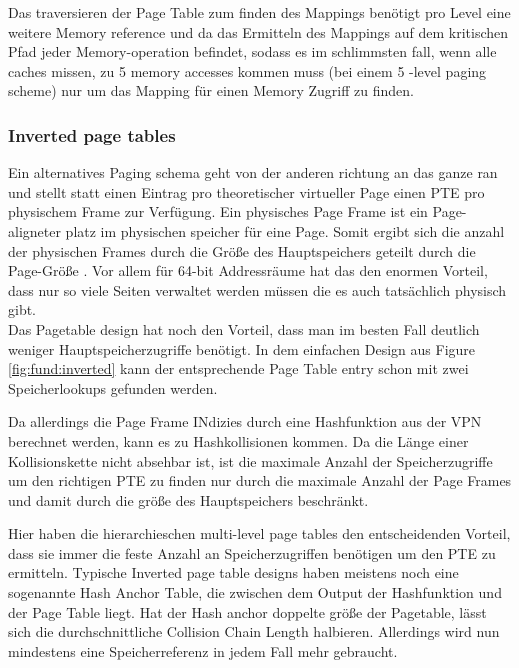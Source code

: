 Das traversieren der Page Table zum finden des Mappings benötigt pro Level eine weitere Memory reference
und da das Ermitteln des Mappings auf dem kritischen Pfad jeder Memory-operation befindet,  sodass
es im schlimmsten fall, wenn alle caches missen, zu 5 memory accesses kommen muss (bei einem 5 -level
paging scheme) nur um das Mapping für einen Memory Zugriff zu finden.
\subsubsection{Inverted page tables}
Ein alternatives Paging schema geht von der anderen richtung an das ganze ran und stellt statt einen
Eintrag pro theoretischer virtueller Page einen PTE pro physischem Frame zur Verfügung.
Ein physisches Page Frame ist ein Page-aligneter platz im physischen speicher für eine Page.
Somit ergibt sich die anzahl der physischen Frames durch die Größe des Hauptspeichers geteilt
durch die Page-Größe .
Vor allem für 64-bit Addressräume hat das den enormen Vorteil, dass nur so viele Seiten verwaltet
werden müssen die es auch tatsächlich physisch gibt.\\
Das Pagetable design hat noch den Vorteil, dass man im besten Fall deutlich weniger Hauptspeicherzugriffe
benötigt. In dem einfachen Design aus Figure \ref{fig:fund:inverted} kann der entsprechende
Page Table entry schon mit zwei Speicherlookups gefunden werden.

Da allerdings die Page Frame INdizies durch eine Hashfunktion aus der VPN berechnet werden, kann es zu
Hashkollisionen kommen. Da die Länge einer Kollisionskette nicht absehbar ist, ist die maximale
Anzahl der Speicherzugriffe um den richtigen PTE zu finden nur durch die maximale Anzahl der
Page Frames und damit durch die größe des Hauptspeichers beschränkt.

Hier haben die hierarchieschen multi-level page tables den entscheidenden Vorteil, dass sie immer
die feste Anzahl an Speicherzugriffen benötigen um den PTE zu ermitteln.
Typische Inverted page table designs haben meistens noch eine sogenannte Hash Anchor Table, die zwischen
dem Output der Hashfunktion und der Page Table liegt. Hat der Hash anchor doppelte größe
der Pagetable, lässt sich die durchschnittliche Collision Chain Length halbieren.
Allerdings wird nun mindestens eine Speicherreferenz in jedem Fall mehr gebraucht.
\cite{jacob1998virtualissues}

